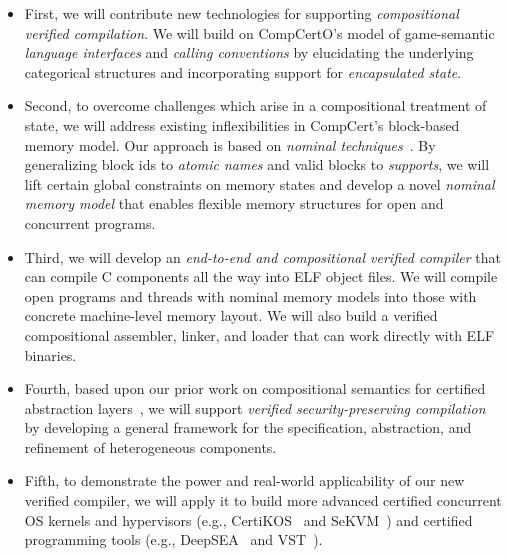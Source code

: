 \begin{itemize} \itemsep 0pt
\item First, we will contribute new technologies for supporting {\em
  compositional verified compilation}.
  We will build on CompCertO's model of
  game-semantic {\em language interfaces} and {\em calling conventions}
  by elucidating the underlying categorical structures
  and incorporating support for {\em encapsulated state}.
\item Second, to overcome challenges which arise
  in a compositional treatment of state,
  we will address existing inflexibilities
  in CompCert's block-based memory model.
  Our approach is based on \emph{nominal
  techniques}~\cite{pitts-nominal,gabby2002}. By generalizing block
  ids to {\em atomic names} and valid blocks to {\em supports},
  we will lift certain global constraints on memory states and develop a
  novel {\em nominal memory model} that enables flexible memory
  structures for open and concurrent programs.
\item Third, we will develop an {\em end-to-end and compositional
  verified compiler} that can compile C components all the way into
  ELF object files. We will compile open programs and threads with
  nominal memory models into those with concrete machine-level memory
  layout. We will also build a verified compositional assembler,
  linker, and loader that can work directly with ELF binaries.
\item Fourth, based upon our prior work on compositional semantics
  for certified abstraction layers~\cite{dscal15,ccal18,koenig20,layered22},
  we will support {\em verified security-preserving
  compilation}~\cite{costanzo16} by developing a general framework
  for the specification, abstraction, and refinement of heterogeneous
  components.
\item Fifth, to demonstrate the power and real-world applicability of
  our new verified compiler, we will apply it to build more advanced
  certified concurrent OS kernels and hypervisors (e.g., CertiKOS~\cite{certikos-osdi16}
  and SeKVM~\cite{sekvm21a,sekvm21b,tao21}) and certified programming tools
    (e.g., DeepSEA~\cite{deepsea19} and VST~\cite{appel11:vst}).
\end{itemize}
